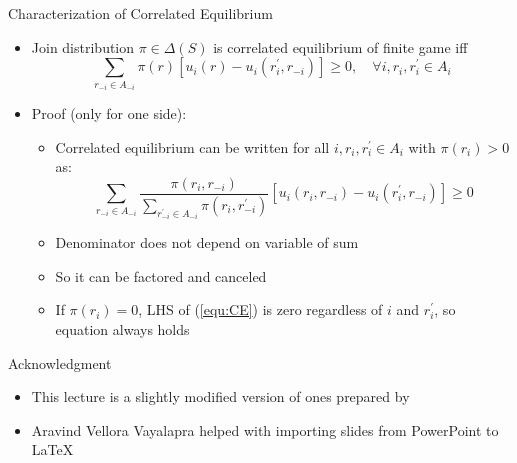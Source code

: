 \documentclass[11pt,aspectratio=169,handout]{beamer}
\begin{document}
  \begin{frame}{Characterization of Correlated Equilibrium}
   \begin{itemize}[<+->] 
    \item Join distribution $\pi \in \Delta(S)$ is correlated equilibrium of finite game iff
     \begin{equation}
     \label{equ:CE}
      \sum_{r_{-i} \in A_{-i}} \pi(r) \left[u_i(r) - u_i(r^{\prime}_i, r_{-i})\right] \ge 0,\quad  \forall i, r_i, r^{\prime}_i \in A_i
     \end{equation}
    \item Proof (only for one side):
    \begin{itemize}
     \item Correlated equilibrium can be written for all $i, r_i, r^{\prime}_i \in A_i$ with $\pi(r_i) > 0$ as:
     $$
      \sum_{r_{-i} \in A_{-i}} \frac{\pi(r_i,r_{-i})}{\sum_{r^{\prime}_{-i} \in A_{-i}} \pi(r_i, r^{\prime}_{-i})} \left[u_i(r_i, r_{-i}) - u_i(r^{\prime}_i, r_{-i})\right] \ge 0
     $$
     \item Denominator does not depend on variable of sum
     \item So it can be factored and canceled
     \item If $\pi(r_i) = 0$, LHS of (\ref{equ:CE}) is zero regardless of $i$ and $r^{\prime}_i$, so equation always holds
    \end{itemize}
   \end{itemize}
  \end{frame}
  
  \begin{frame}{Acknowledgment}
   \begin{itemize}
    \setlength{\itemsep}{1em}
    \item This lecture is a slightly modified version of ones prepared by
    \item Aravind Vellora Vayalapra helped with importing slides from PowerPoint to \LaTeX
   \end{itemize}
  \end{frame}
 
\end{document}
